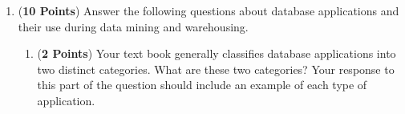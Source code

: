 \documentclass[12pt]{article}
\begin{document}
\begin{enumerate}
\begin{enumerate}
  \end{enumerate}


    





\newpage

\item ({\bf 10 Points}) Answer the following questions about database
  applications and their use during data mining and warehousing.

  \begin{enumerate}

  \item ({\bf 2 Points}) Your text book generally classifies database
    applications into two distinct categories.  What are these two
    categories?  Your response to this part of the question should
    include an example of each type of application.



\end{enumerate}
\end{enumerate}
\end{document}
